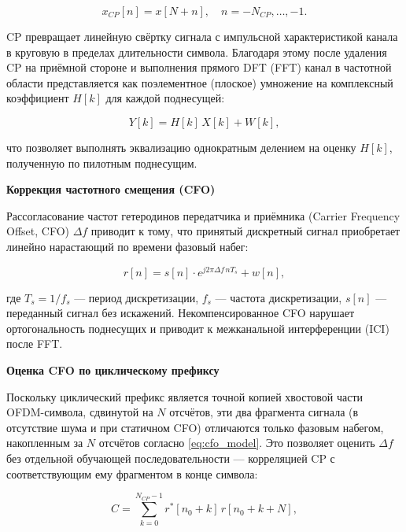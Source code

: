 \begin{equation}
    x_{CP}[n] = x[N + n], \quad n = -N_{CP},\dots,-1.
\end{equation}

CP превращает линейную свёртку сигнала с импульсной характеристикой канала
в круговую в пределах длительности символа. Благодаря этому после удаления
CP на приёмной стороне и выполнения прямого DFT (FFT) канал в частотной
области представляется как поэлементное (плоское) умножение на комплексный
коэффициент $H[k]$ для каждой поднесущей:

\begin{equation}
    Y[k] = H[k]\,X[k] + W[k],
\end{equation}

что позволяет выполнять эквализацию однократным делением на оценку $H[k]$,
полученную по пилотным поднесущим.

\vspace{20pt}

\textbf{Коррекция частотного смещения (CFO)}\newline

Рассогласование частот гетеродинов передатчика и приёмника
(Carrier Frequency Offset, CFO) $\Delta f$ приводит к тому, что принятый
дискретный сигнал приобретает линейно нарастающий по времени фазовый
набег:

\begin{equation}
    r[n] = s[n] \cdot e^{j2\pi \Delta f \, n T_s} + w[n],
    \label{eq:cfo_model}
\end{equation}

где $T_s = 1/f_s$ — период дискретизации, $f_s$ — частота дискретизации,
$s[n]$ — переданный сигнал без искажений. Некомпенсированное CFO нарушает
ортогональность поднесущих и приводит к межканальной интерференции (ICI)
после FFT.

\vspace{20pt}

\textbf{Оценка CFO по циклическому префиксу}\newline

Поскольку циклический префикс является точной копией хвостовой части
OFDM-символа, сдвинутой на $N$ отсчётов, эти два фрагмента сигнала (в
отсутствие шума и при статичном CFO) отличаются только фазовым набегом,
накопленным за $N$ отсчётов согласно \eqref{eq:cfo_model}. Это позволяет
оценить $\Delta f$ без отдельной обучающей последовательности —
корреляцией CP с соответствующим ему фрагментом в конце символа:

\begin{equation}
    C = \sum_{k=0}^{N_{CP}-1} r^{*}[n_0 + k]\, r[n_0 + k + N],
\end{equation}


